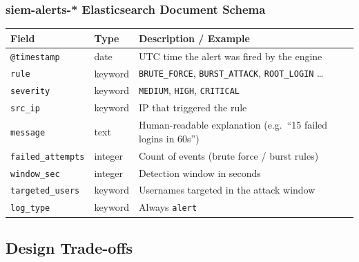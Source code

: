 \documentclass[12pt,a4paper]{article}
\newcommand{\field}[1]{\texttt{#1}}
\begin{document}
\subsubsection*{siem-alerts-* Elasticsearch Document Schema}

\begin{center}
\begin{tabular}{p{3.5cm}p{1.8cm}p{7.8cm}}
  \toprule
  \textbf{Field} & \textbf{Type} & \textbf{Description / Example} \\
  \midrule
  \field{@timestamp}        & date    & UTC time the alert was fired by the engine \\
  \field{rule}              & keyword & \texttt{BRUTE\_FORCE}, \texttt{BURST\_ATTACK}, \texttt{ROOT\_LOGIN} \ldots \\
  \field{severity}          & keyword & \texttt{MEDIUM}, \texttt{HIGH}, \texttt{CRITICAL} \\
  \field{src\_ip}           & keyword & IP that triggered the rule \\
  \field{message}           & text    & Human-readable explanation (e.g.\ ``15 failed logins in 60s'') \\
  \field{failed\_attempts}  & integer & Count of events (brute force / burst rules) \\
  \field{window\_sec}       & integer & Detection window in seconds \\
  \field{targeted\_users}   & keyword & Usernames targeted in the attack window \\
  \field{log\_type}         & keyword & Always \texttt{alert} \\
  \bottomrule
\end{tabular}
\end{center}

\subsection{Design Trade-offs}
\end{document}
